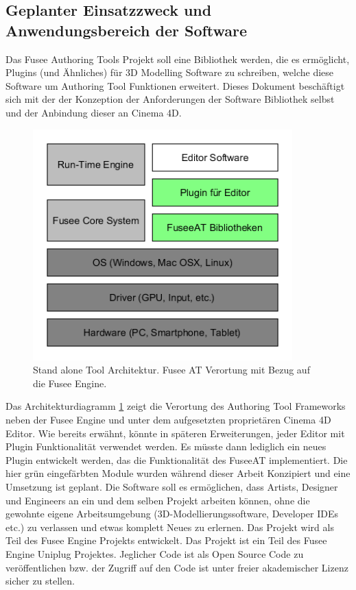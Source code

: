 \documentclass[pagesize, paper=a4, fontsize=12pt, titlepage=true, headings=small, headnosepline, abstractoff, liststotoc, nochapterprefix, plainheadsepline, twoside]{scrreprt}
\begin{document}
\subsection{Geplanter Einsatzzweck und Anwendungsbereich der Software}
Das Fusee Authoring Tools Projekt soll eine Bibliothek werden, die es ermöglicht, Plugins (und Ähnliches) für 3D Modelling Software zu schreiben, welche diese Software um Authoring Tool Funktionen erweitert. Dieses Dokument beschäftigt sich mit der der Konzeption der Anforderungen der Software Bibliothek selbst und der Anbindung dieser an Cinema 4D.

\begin{figure}[ht]
	\centering
	\includegraphics[width=10cm]{Bilder/Engine_Tool_Architektur.png}
	\caption{Stand alone Tool Architektur. Fusee AT Verortung mit Bezug auf die Fusee Engine.}
	\label{FuseeToolBezug}
\end{figure}

Das Architekturdiagramm \ref{FuseeToolBezug} zeigt die Verortung des Authoring Tool Frameworks neben der Fusee Engine und unter dem aufgesetzten proprietären Cinema 4D Editor. Wie bereits erwähnt, könnte in späteren Erweiterungen, jeder Editor mit Plugin Funktionalität verwendet werden. Es müsste dann lediglich ein neues Plugin entwickelt werden, das die Funktionalität des FuseeAT implementiert. Die hier grün eingefärbten Module wurden während dieser Arbeit Konzipiert und eine Umsetzung ist geplant.
Die Software soll es ermöglichen, dass Artists, Designer und Engineers an ein und dem selben Projekt arbeiten können, ohne die gewohnte eigene Arbeitsumgebung (3D-Modellierungssoftware, Developer IDEs etc.) zu verlassen und etwas komplett Neues zu erlernen.
Das Projekt wird als Teil des Fusee Engine Projekts entwickelt. Das Projekt ist ein Teil des Fusee Engine Uniplug Projektes.
Jeglicher Code ist als Open Source Code zu veröffentlichen bzw. der Zugriff auf den Code ist unter freier akademischer Lizenz sicher zu stellen.
\end{document}
